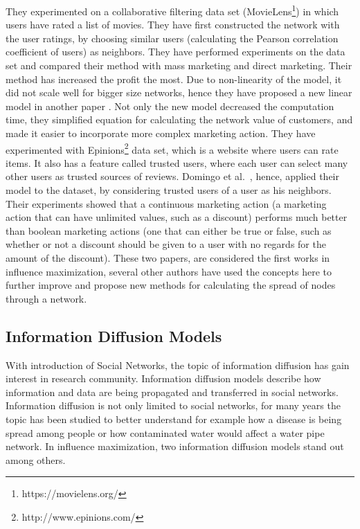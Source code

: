 \documentclass[english]{tktltiki}
\begin{document}
They experimented on a collaborative filtering data set (MovieLens\footnote{https://movielens.org/}) in which users have rated a list of movies. They have first constructed the network with the user ratings, by choosing similar users (calculating the Pearson correlation coefficient of users) as neighbors. They have performed experiments on the data set and compared their method with mass marketing and direct marketing. Their method has increased the profit the most. Due to non-linearity of the model, it did not scale well for bigger size networks, hence they have proposed a new linear model in another paper \cite{domingo02}. Not only the new model decreased the computation time, they simplified equation for calculating the network value of customers, and made it easier to incorporate more complex marketing action. They have experimented with Epinions\footnote{http://www.epinions.com/} data set, which is a website where users can rate items. It also has a feature called trusted users, where each user can select many other users as trusted sources of reviews. Domingo et al.\ \cite{domingo02}, hence, applied their model to the dataset, by considering trusted users of a user as his neighbors. Their experiments showed that a continuous marketing action (a marketing action that can have unlimited values, such as a discount) performs much better than boolean marketing actions (one that can either be true or false, such as whether or not a discount should be given to a user with no regards for the amount of the discount). These two papers, are considered the first works in influence maximization, several other authors have used the concepts here to further improve and propose new methods for calculating the spread of nodes through a network.

\subsection{Information Diffusion Models}
With introduction of Social Networks, the topic of information diffusion has gain interest in research community. Information diffusion models describe how information and data are being propagated and transferred in social networks. Information diffusion is not only limited to social networks, for many years the topic has been studied to better understand for example how a disease is being spread among people or how contaminated water would affect a water pipe network. In influence maximization, two information diffusion models stand out among others. 
\end{document}
